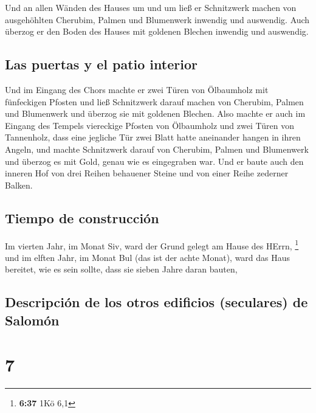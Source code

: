  Und an allen Wänden des Hauses um und um ließ er
Schnitzwerk machen von ausgehöhlten Cherubim, Palmen und Blumenwerk
inwendig und auswendig.  Auch überzog er den Boden des
Hauses mit goldenen Blechen inwendig und auswendig.

\hypertarget{las-puertas-y-el-patio-interior}{%
\subsection{Las puertas y el patio
interior}\label{las-puertas-y-el-patio-interior}}

 Und im Eingang des Chors machte er zwei Türen von
Ölbaumholz mit fünfeckigen Pfosten  und ließ Schnitzwerk
darauf machen von Cherubim, Palmen und Blumenwerk und überzog sie mit
goldenen Blechen.  Also machte er auch im Eingang des
Tempels viereckige Pfosten von Ölbaumholz  und zwei Türen
von Tannenholz, dass eine jegliche Tür zwei Blatt hatte aneinander
hangen in ihren Angeln,  und machte Schnitzwerk darauf
von Cherubim, Palmen und Blumenwerk und überzog es mit Gold, genau wie
es eingegraben war.  Und er baute auch den inneren Hof
von drei Reihen behauener Steine und von einer Reihe zederner Balken.

\hypertarget{tiempo-de-construcciuxf3n}{%
\subsection{Tiempo de construcción}\label{tiempo-de-construcciuxf3n}}

 Im vierten Jahr, im Monat Siv, ward der Grund gelegt am
Hause des HErrn, \footnote{\textbf{6:37} 1Kö 6,1}  und im
elften Jahr, im Monat Bul (das ist der achte Monat), ward das Haus
bereitet, wie es sein sollte, dass sie sieben Jahre daran bauten,

\hypertarget{descripciuxf3n-de-los-otros-edificios-seculares-de-salomuxf3n}{%
\subsection{Descripción de los otros edificios (seculares) de
Salomón}\label{descripciuxf3n-de-los-otros-edificios-seculares-de-salomuxf3n}}

\hypertarget{section-6}{%
\section{7}\label{section-6}}

